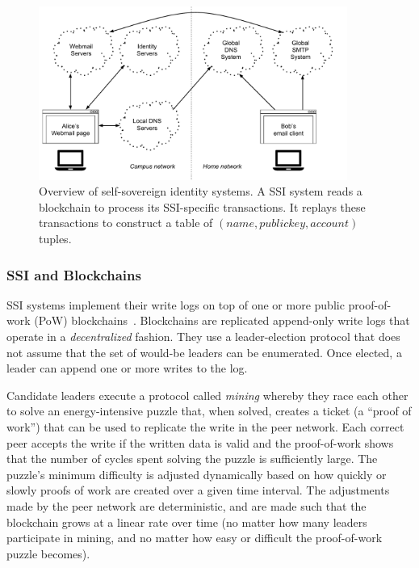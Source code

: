 \begin{figure}[h!]
   \centering
   \includegraphics[width=0.9\textwidth,page=14]{figures/dissertation-figures}
   \caption{Overview of self-sovereign identity systems.  A SSI system reads a
   blockchain to process its SSI-specific transactions.  It replays these
   transactions to construct a table of $(name, public key, account)$ tuples.}
   \label{fig:chap2-ssi-system}
\end{figure}

\subsubsection{SSI and Blockchains}

SSI systems implement their write logs on top of one or more public
proof-of-work (PoW) blockchains~\cite{bitcoin}.  Blockchains are replicated append-only write logs that
operate in a \emph{decentralized} fashion.  They use a leader-election protocol
that does not assume that the set of would-be leaders can be enumerated.  Once
elected, a leader can append one or more writes to the log.

Candidate leaders execute a protocol called \emph{mining} whereby they
race each other to solve an energy-intensive puzzle that, when
solved, creates a ticket (a ``proof of work'') that can be used to replicate the
write in the peer network.  Each correct peer accepts the write if the written
data is valid and the proof-of-work shows that the number of cycles spent solving the
puzzle is sufficiently large.
The puzzle's minimum difficulty is adjusted dynamically based on how quickly or
slowly proofs of work are created over a given time interval.  The adjustments
made by the peer network are deterministic, and are made such that the
blockchain grows at a linear rate over time (no matter how many leaders
participate in mining, and no matter how easy or difficult the proof-of-work puzzle
becomes).

